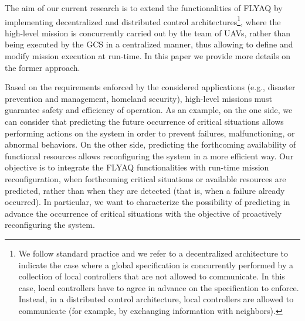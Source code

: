 \documentclass[letterpaper, 10 pt, conference]{ieeeconf}
\begin{document}
The aim of our current research is to extend the functionalities of FLYAQ by implementing  decentralized and distributed control architectures\footnote{We follow standard practice and we refer to a decentralized architecture to indicate the case where a global specification is concurrently performed by a collection of local controllers that are not allowed to communicate. In this case, local controllers have to agree in advance on the specification to enforce.
Instead, in a distributed control architecture, local controllers are allowed to communicate (for example, by exchanging information with neighbors).}, 
where the high-level mission is concurrently carried out by the team of UAVs, rather than being executed by the GCS in a centralized manner, thus allowing to define and modify mission execution at run-time.
%
%
In this paper we provide more details on the former approach. 

Based on the requirements enforced by the considered applications (e.g., disaster prevention and management, homeland security), high-level missions must guarantee safety and efficiency of operation. 
As an example, on the one side, we can consider that predicting the future occurrence of critical situations allows performing actions on the system in order to prevent failures, malfunctioning, or abnormal behaviors. On the other side, predicting the forthcoming availability of functional resources allows reconfiguring the system in a more efficient way.
Our objective is to integrate the FLYAQ functionalities with run-time mission reconfiguration, when forthcoming critical situations or available resources are predicted, rather than when they are detected (that is, when a failure already occurred). In particular, we want to characterize the possibility of predicting in advance the occurrence of critical situations with the objective of proactively reconfiguring the system.
\end{document}
